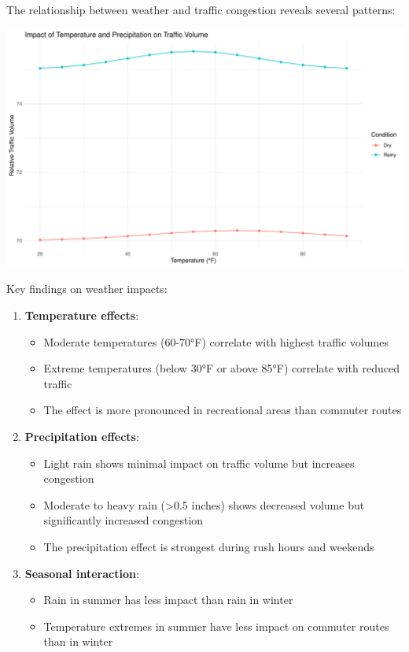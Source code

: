 \documentclass[
  letterpaper,
  DIV=11,
  numbers=noendperiod]{scrreprt}
\providecommand{\tightlist}{%
  \setlength{\itemsep}{0pt}\setlength{\parskip}{0pt}}\usepackage{longtable,booktabs,array}
\begin{document}
The relationship between weather and traffic congestion reveals several
patterns:

\includegraphics[width=1\textwidth,height=\textheight]{figures/weather-impact-1.pdf}

Key findings on weather impacts:

\begin{enumerate}
\def\labelenumi{\arabic{enumi}.}
\tightlist
\item
  \textbf{Temperature effects}:

  \begin{itemize}
  \tightlist
  \item
    Moderate temperatures (60-70°F) correlate with highest traffic
    volumes
  \item
    Extreme temperatures (below 30°F or above 85°F) correlate with
    reduced traffic
  \item
    The effect is more pronounced in recreational areas than commuter
    routes
  \end{itemize}
\item
  \textbf{Precipitation effects}:

  \begin{itemize}
  \tightlist
  \item
    Light rain shows minimal impact on traffic volume but increases
    congestion
  \item
    Moderate to heavy rain (\textgreater0.5 inches) shows decreased
    volume but significantly increased congestion
  \item
    The precipitation effect is strongest during rush hours and weekends
  \end{itemize}
\item
  \textbf{Seasonal interaction}:

  \begin{itemize}
  \tightlist
  \item
    Rain in summer has less impact than rain in winter
  \item
    Temperature extremes in summer have less impact on commuter routes
    than in winter
  \end{itemize}
\end{enumerate}
\end{document}
